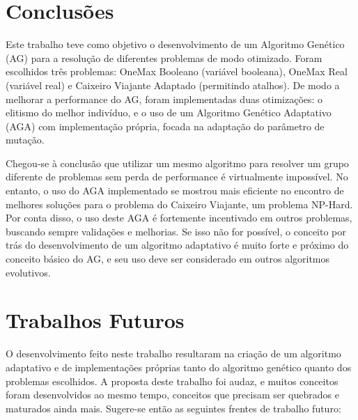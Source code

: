 \label{6_conclusoes}

\section{Conclusões}

Este trabalho teve como objetivo o desenvolvimento de um Algoritmo Genético (AG) para a resolução de diferentes problemas de modo otimizado. Foram escolhidos três problemas: OneMax Booleano (variável booleana), OneMax Real (variável real) e Caixeiro Viajante Adaptado (permitindo atalhos). De modo a melhorar a performance do AG, foram implementadas duas otimizações: o elitismo do melhor indivíduo, e o uso de um Algoritmo Genético Adaptativo (AGA) com implementação própria, focada na adaptação do parâmetro de mutação.

Chegou-se à conclusão que utilizar um mesmo algoritmo para resolver um grupo diferente de problemas sem perda de performance é virtualmente impossível. No entanto, o uso do AGA implementado se mostrou mais eficiente no encontro de melhores soluções para o problema do Caixeiro Viajante, um problema NP-Hard. Por conta disso, o uso deste AGA é fortemente incentivado em outros problemas, buscando sempre validações e melhorias. Se isso não for possível, o conceito por trás do desenvolvimento de um algoritmo adaptativo é muito forte e próximo do conceito básico do AG, e seu uso deve ser considerado em outros algoritmos evolutivos.

\section{Trabalhos Futuros}

O desenvolvimento feito neste trabalho resultaram na criação de um algoritmo adaptativo e de implementações próprias tanto do algoritmo genético quanto dos problemas escolhidos. A proposta deste trabalho foi audaz, e muitos conceitos foram desenvolvidos ao mesmo tempo, conceitos que precisam ser quebrados e maturados ainda mais. Sugere-se então as seguintes frentes de trabalho futuro:

